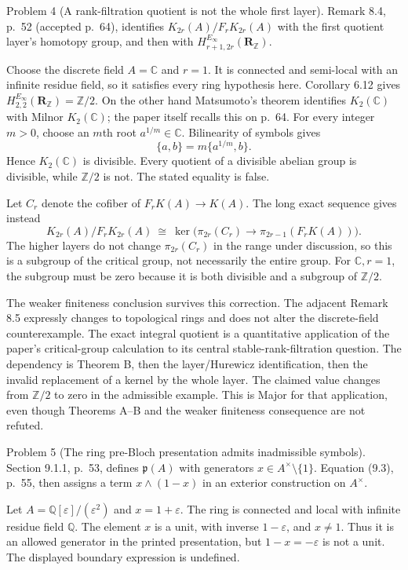 \documentclass[10pt]{article}
\begin{document}
Problem 4 (A rank-filtration quotient is not the whole first layer).  Remark 8.4, p. 52 (accepted p. 64), identifies \(K_{2r}(A)/F_rK_{2r}(A)\) with the first quotient layer’s homotopy group, and then with \(H^{E_\infty}_{r+1,2r}(\mathbf R_\mathbb Z)\).\par
Choose the discrete field \(A=\mathbb C\) and \(r=1\). It is connected and semi-local with an infinite residue field, so it satisfies every ring hypothesis here. Corollary 6.12 gives \(H^{E_\infty}_{2,2}(\mathbf R_\mathbb Z)=\mathbb Z/2\). On the other hand Matsumoto’s theorem identifies \(K_2(\mathbb C)\) with Milnor \(K_2(\mathbb C)\); the paper itself recalls this on p. 64. For every integer \(m>0\), choose an \(m\)th root \(a^{1/m}\in\mathbb C\). Bilinearity of symbols gives \[\{a,b\}=m\{a^{1/m},b\}.\] Hence \(K_2(\mathbb C)\) is divisible. Every quotient of a divisible abelian group is divisible, while \(\mathbb Z/2\) is not. The stated equality is false.\par
Let \(C_r\) denote the cofiber of \(F_rK(A)\to K(A)\). The long exact sequence gives instead \[K_{2r}(A)/F_rK_{2r}(A)
 \ \cong\
 \ker\bigl(\pi_{2r}(C_r)\longrightarrow\pi_{2r-1}(F_rK(A))\bigr).\] The higher layers do not change \(\pi_{2r}(C_r)\) in the range under discussion, so this is a subgroup of the critical group, not necessarily the entire group. For \(\mathbb C,r=1\), the subgroup must be zero because it is both divisible and a subgroup of \(\mathbb Z/2\).\par
The weaker finiteness conclusion survives this correction. The adjacent Remark 8.5 expressly changes to topological rings and does not alter the discrete-field counterexample. The exact integral quotient is a quantitative application of the paper’s critical-group calculation to its central stable-rank-filtration question. The dependency is Theorem B, then the layer/Hurewicz identification, then the invalid replacement of a kernel by the whole layer. The claimed value changes from \(\mathbb Z/2\) to zero in the admissible example. This is Major for that application, even though Theorems A–B and the weaker finiteness consequence are not refuted.\par
Problem 5 (The ring pre-Bloch presentation admits inadmissible symbols).  Section 9.1.1, p. 53, defines \(\mathfrak p(A)\) with generators \(x\in A^\times\setminus\{1\}\). Equation (9.3), p. 55, then assigns a term \(x\wedge(1-x)\) in an exterior construction on \(A^\times\).\par
Let \(A=\mathbb Q[\varepsilon]/(\varepsilon^2)\) and \(x=1+\varepsilon\). The ring is connected and local with infinite residue field \(\mathbb Q\). The element \(x\) is a unit, with inverse \(1-\varepsilon\), and \(x\ne1\). Thus it is an allowed generator in the printed presentation, but \(1-x=-\varepsilon\) is not a unit. The displayed boundary expression is undefined.\par
\end{document}
